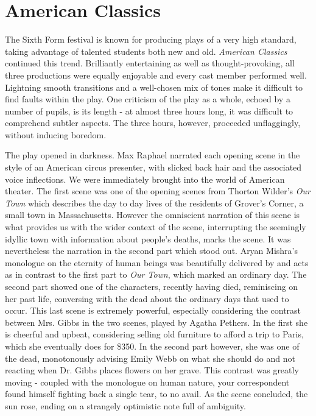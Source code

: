 \documentclass[11pt,a4paper]{report}
\begin{document}
\section{American Classics}

\begin{multicols}{2}

The Sixth Form festival is known for producing plays of a very high
standard, taking advantage of talented students both new and old.
\textit{American Classics} continued this trend. Brilliantly entertaining
as well as thought-provoking, all three productions were equally
enjoyable and every cast member performed well. Lightning smooth
transitions and a well-chosen mix of tones make it difficult to find
faults within the play. One criticism of the play as a whole, echoed by
a number of pupils, is its length - at almost three hours long, it was
difficult to comprehend subtler aspects. The three hours, however,
proceeded unflaggingly, without inducing boredom.

The play opened in darkness. Max Raphael narrated each opening scene in
the style of an American circus presenter, with slicked back hair and
the associated voice inflections. We were immediately brought into the
world of American theater. The first scene was one of the opening scenes
from Thorton Wilder's \textit{Our Town} which describes the day to day
lives of the residents of Grover's Corner, a small town in
Massachusetts. However the omniscient narration of this scene is what
provides us with the wider context of the scene, interrupting the
seemingly idyllic town with information about people's deaths, marks the
scene. It was nevertheless the narration in the second part which stood
out. Aryan Mishra's monologue on the eternity of human beings was
beautifully delivered by and acts as in contrast to the first part to
\textit{Our Town}, which marked an ordinary day. The second part showed
one of the characters, recently having died, reminiscing on her past
life, conversing with the dead about the ordinary days that used to
occur. This last scene is extremely powerful, especially considering the
contrast between Mrs. Gibbs in the two scenes, played by Agatha Pethers.
In the first she is cheerful and upbeat, considering selling old
furniture to afford a trip to Paris, which she eventually does for
\$350. In the second part however, she was one of the dead, monotonously
advising Emily Webb on what she should do and not reacting when Dr.
Gibbs places flowers on her grave. This contrast was greatly moving -
coupled with the monologue on human nature, your correspondent found
himself fighting back a single tear, to no avail. As the scene
concluded, the sun rose, ending on a strangely optimistic note full of
ambiguity.


\end{multicols}
\end{document}
